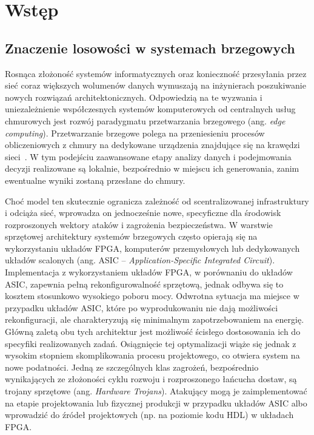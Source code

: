 \chapter{Wstęp}

\section{Znaczenie losowości w systemach brzegowych}

\noindent Rosnąca złożoność systemów informatycznych oraz konieczność przesyłania przez 
sieć coraz większych wolumenów danych wymuszają na inżynierach poszukiwanie 
nowych rozwiązań architektonicznych. Odpowiedzią na te wyzwania i uniezależnienie 
współczesnych systemów komputerowych od centralnych usług chmurowych jest 
rozwój paradygmatu przetwarzania brzegowego (ang. \textit{edge computing}). Przetwarzanie 
brzegowe polega na przeniesieniu procesów obliczeniowych z chmury na dedykowane 
urządzenia znajdujące się na krawędzi sieci~\cite{Edge-computing}. W tym 
podejściu zaawansowane etapy analizy danych i podejmowania decyzji realizowane 
są lokalnie, bezpośrednio w miejscu ich generowania, zanim ewentualne wyniki 
zostaną przesłane do chmury.

Choć model ten skutecznie ogranicza zależność od scentralizowanej infrastruktury 
i odciąża sieć, wprowadza on jednocześnie nowe, specyficzne dla środowisk 
rozproszonych wektory ataków i zagrożenia bezpieczeństwa. W warstwie sprzętowej 
architektury systemów brzegowych często opierają się na wykorzystaniu układów 
FPGA, komputerów przemysłowych lub dedykowanych układów scalonych 
(ang. ASIC -- \textit{Application-Specific Integrated Circuit}). Implementacja z 
wykorzystaniem układów FPGA, w porównaniu do układów ASIC, zapewnia pełną 
rekonfigurowalność sprzętową, jednak odbywa się to kosztem stosunkowo wysokiego 
poboru mocy. Odwrotna sytuacja ma miejsce w przypadku układów ASIC, które po 
wyprodukowaniu nie dają możliwości rekonfiguracji, ale charakteryzują się 
minimalnym zapotrzebowaniem na energię. Główną zaletą obu tych architektur 
jest możliwość ścisłego dostosowania ich do specyfiki realizowanych zadań. 
Osiągnięcie tej optymalizacji wiąże się jednak z wysokim stopniem skomplikowania 
procesu projektowego, co otwiera system na nowe podatności. Jedną ze szczególnych 
klas zagrożeń, bezpośrednio wynikających ze złożoności cyklu rozwoju i 
rozproszonego łańcucha dostaw, są trojany sprzętowe (ang. \textit{Hardware Trojans}). 
Atakujący mogą je zaimplementować na etapie projektowania lub fizycznej 
produkcji w przypadku układów ASIC albo wprowadzić do źródeł projektowych 
(np. na poziomie kodu HDL) w układach FPGA.

